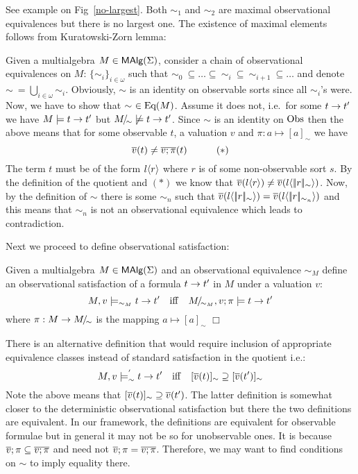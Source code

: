 \begin{Proof} 
See example on Fig~\ref{no-largest}. Both $\sim_1$ and $\sim_2$ are
maximal observational equivalences but there is no largest one. The
existence of maximal elements follows from Kuratowski-Zorn lemma:

Given a multialgebra $M \in \mbox{\rm\sf MAlg}(\Sigma)$, consider a chain of
observational equivalences on $M$: $\{ \sim_i \}_{i \in \omega}$ such
that $\sim_0\ \subseteq \ldots \subseteq\ \sim_i\ \subseteq\
\sim_{i+1}\ \subseteq \ldots$ and denote $\sim\: = \bigcup_{i \in
\omega} \sim_i$. Obviously, $\sim$ is an identity on observable sorts
since all $\sim_i$'s were. Now, we have to show that $\sim\ \in
\mbox{Eq}(M)$. Assume it does not, i.e.\ for some $t \rightarrow t'$ we have $M
\models t \rightarrow t'$ but $M\!{\textstyle /}\!_\sim \not\models t \rightarrow t'$. Since $\sim$
is an identity on $\rm Obs$ then the above means that for some observable
$t$, a valuation $v$ and $\pi : a \mapsto [a]_\sim$ we have
\[ 
\mbox{$\overline{v}$}(t) \not= \mbox{$\overline{v;\pi}$}(t) \quad\quad\quad (\ast) 
\]
The term $t$ must be of the form $l\langle r\rangle $ where $r$ is of some
non-observable sort $s$. By the definition of the quotient and
$(\ast)$ we know that $\mbox{$\overline{v}$}(l\langle r\rangle ) \not=
\mbox{$\overline{v}$}(l\langle |\!|r|\!|_\sim\rangle )$. Now, by the definition of $\sim$ there is
some $\sim_n$ such that $\mbox{$\overline{v}$}(l\langle |\!|r|\!|_\sim\rangle ) =
\mbox{$\overline{v}$}(l\langle |\!|r|\!|_{\sim_n}\rangle )$ and this means that $\sim_n$ is not an
observational equivalence which leads to contradiction.
\end{Proof}
\medskip

Next we proceed to define observational satisfaction:

\begin{Definition}
Given a multialgebra $M \in \mbox{\rm\sf MAlg}(\Sigma)$ and an observational
equivalence $\sim_M$ define an observational satisfaction of a formula
$t \rightarrow t'$ in $M$ under a valuation $v$:
\[
M,v \models_{\sim_M} t \rightarrow t' \quad {\rm iff} 
                \quad M\!{\textstyle /}\!_{\sim_M},v;\pi \models t \rightarrow t' 
\]
where $\pi: M \rightarrow M\!{\textstyle /}\!_\sim$ is the mapping $a \mapsto [a]_\sim$
\hfill$\Box$
\end{Definition}
%
There is an alternative definition that would require inclusion of
appropriate equivalence classes instead of standard satisfaction in
the quotient i.e.:
\[
M,v \models^{'}_\sim t \rightarrow t' \quad {\rm iff} 
                \quad [\mbox{$\overline{v}$}(t)]_\sim \supseteq [\mbox{$\overline{v}$}(t')]_\sim
\]
Note the above means that $[\mbox{$\overline{v}$}(t)]_\sim \supseteq
\mbox{$\overline{v}$}(t')$. The latter definition is somewhat closer to the
deterministic observational satisfaction but there the two definitions
are equivalent. In our framework, the definitions are equivalent for
observable formulae but in general it may not be so for unobservable
ones. It is because $\mbox{$\overline{v}$};\pi \subseteq \mbox{$\overline{v;\pi}$}$ and need not
$\mbox{$\overline{v}$};\pi = \mbox{$\overline{v;\pi}$}$.
Therefore, we may want to find conditions on $\sim$ to imply equality
there.

